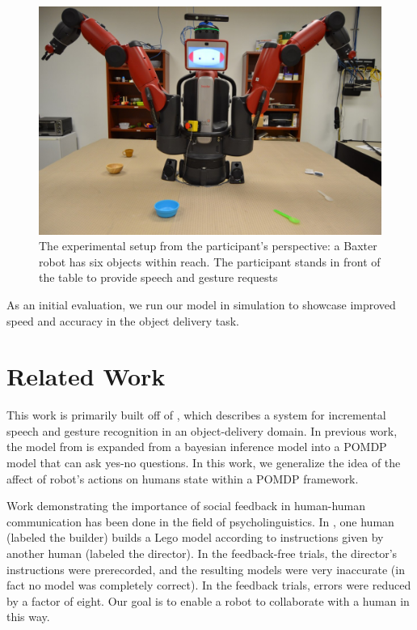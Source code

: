 \documentclass[conference]{IEEEtran}
\begin{document}
\begin{figure}[t]
	\begin{center}
		\includegraphics[scale=0.17]{resources/firstPerson}
		\caption{The experimental setup from the participant's perspective: a Baxter robot has six objects within reach. The participant stands in front of the table to provide speech and gesture requests}
	\end{center}
\end{figure}



As an initial evaluation, we run our model in simulation to showcase improved speed and accuracy in the object delivery task. 

\section{Related Work}

This work is primarily built off of \citet{whitney16}, which describes a system for incremental speech and gesture recognition in an object-delivery domain. In previous work\citep{socialfeedback}, the model from \citet{whitney16} is expanded from a bayesian inference model into a POMDP model that can ask yes-no questions. In this work, we generalize the idea of the affect of robot's actions on humans state within a POMDP framework. 

Work demonstrating the importance of social feedback in human-human
communication has been done in the field of psycholinguistics. In  \citet{clark04}, one human (labeled the builder)
builds a Lego model according to instructions given by another human
(labeled the director). In the feedback-free trials, the director's
instructions were prerecorded, and the resulting models were very
inaccurate (in fact no model was completely correct). In the feedback
trials, errors were reduced by a factor of eight. Our goal is to
enable a robot to collaborate with a human in this way.
\end{document}
